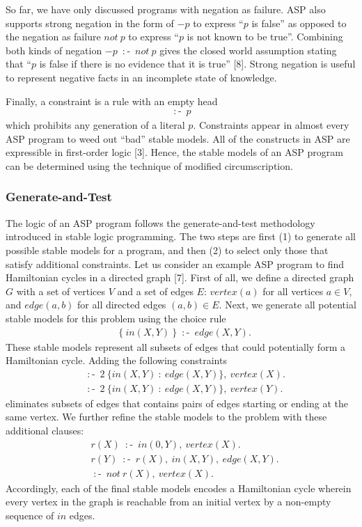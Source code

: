 So far, we have only discussed programs with negation as failure. ASP also supports 
strong negation in the form of $-p$ to express ``$p$ is false'' as opposed to 
the negation as failure $not \: p$ to express ``$p$ is not known to be true''. Combining 
both kinds of negation $-p \: \mathop{:\!\!-} \: not \: p$ gives the closed world assumption 
stating that ``$p$ is false if there is no evidence that it is true'' [8]. Strong negation 
is useful to represent negative facts in an incomplete state of knowledge.

Finally, a constraint is a rule with an empty head 
\begin{align*}
    \mathop{:\!\!-} \: p
\end{align*}
which prohibits 
any generation of a literal $p$. Constraints appear in almost every ASP program to weed out 
``bad'' stable models. All of the constructs in ASP are expressible in first-order 
logic [3]. Hence, the stable models of an ASP program can be determined using the 
technique of modified circumscription.

\subsubsection{Generate-and-Test}
The logic of an ASP program follows the generate-and-test methodology introduced in 
stable logic programming. The two steps are first (1) to generate all possible stable models 
for a program, and then (2) to select only those that satisfy additional constraints. Let us 
consider an example ASP program to find Hamiltonian cycles in a directed graph [7]. First of all, 
we define a directed graph $G$ with a set of vertices $V$ and a set of edges $E$: 
$vertex(a)$ for all vertices $a \in V$, and $edge(a,b)$ for all directed edges $(a,b) \in E$. Next, 
we generate all potential stable models for this problem using the choice rule 
\begin{align*}
    & \{ \: in(X,Y) \: \} \: \mathop{:\!\!-} \: edge(X,Y). 
\end{align*}
These stable models represent all subsets of edges that could potentially form a Hamiltonian 
cycle. Adding the following constraints 
\begin{align*}
    & \mathop{:\!\!-} \: 2 \: \{in(X,Y) \: : \: edge(X,Y)\}, \: vertex(X). \\
    & \mathop{:\!\!-} \: 2 \: \{in(X,Y) \: : \: edge(X,Y)\}, \: vertex(Y). 
\end{align*}
eliminates subsets of edges that contains pairs of edges starting or ending at the same 
vertex. We further refine the stable models to the problem with these additional clauses: 
\begin{align*}
    & r(X) \: \mathop{:\!\!-} \: in(0,Y), \: vertex(X).\\
    & r(Y) \: \mathop{:\!\!-} \: r(X), \: in(X,Y), \: edge(X,Y). \\ 
    & \mathop{:\!\!-} \: not \: r(X), \: vertex(X).
\end{align*}
Accordingly, each of the final stable models encodes a Hamiltonian cycle wherein every vertex in the graph 
is reachable from an initial 
vertex by a non-empty sequence of $in$ edges.

